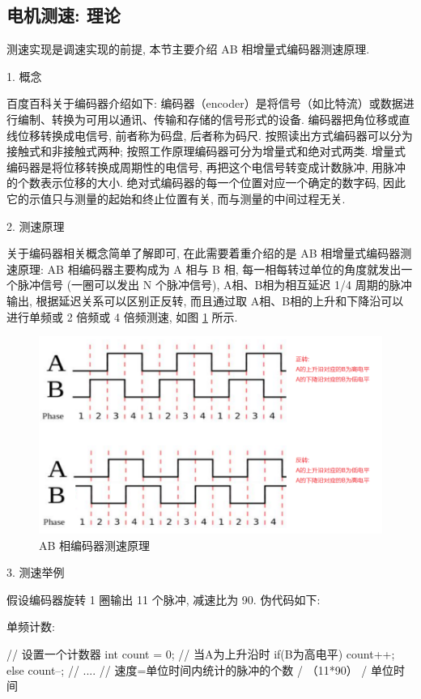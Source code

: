 \documentclass[openany, fontset=windowsold]{ctexbook}
\theoremstyle{kaiti}
\theoremstyle{normal}
\begin{document}
\subsection{电机测速: 理论}

测速实现是调速实现的前提, 本节主要介绍 AB 相增量式编码器测速原理.

1. 概念

百度百科关于编码器介绍如下: 编码器（encoder）是将信号（如比特流）或数据进行编制、转换为可用以通讯、传输和存储的信号形式的设备. 编码器把角位移或直线位移转换成电信号, 前者称为码盘, 后者称为码尺. 按照读出方式编码器可以分为接触式和非接触式两种; 按照工作原理编码器可分为增量式和绝对式两类. 增量式编码器是将位移转换成周期性的电信号, 再把这个电信号转变成计数脉冲, 用脉冲的个数表示位移的大小. 绝对式编码器的每一个位置对应一个确定的数字码, 因此它的示值只与测量的起始和终止位置有关, 而与测量的中间过程无关.

2. 测速原理

关于编码器相关概念简单了解即可, 在此需要着重介绍的是 AB 相增量式编码器测速原理: AB 相编码器主要构成为 A 相与 B 相, 每一相每转过单位的角度就发出一个脉冲信号 (一圈可以发出 N 个脉冲信号), A相、B相为相互延迟 1/4 周期的脉冲输出, 根据延迟关系可以区别正反转, 而且通过取 A相、B相的上升和下降沿可以进行单频或 2 倍频或 4 倍频测速, 如图 \ref{fig:speed_measure_AB_phase} 所示.

\begin{figure}[!ht]
  \centering
  \includegraphics[width=.9\textwidth]{speed_measure_AB_phase.png}
  \caption{AB 相编码器测速原理}
  \label{fig:speed_measure_AB_phase}
\end{figure}

3. 测速举例

假设编码器旋转 1 圈输出 11 个脉冲, 减速比为 90. 伪代码如下:

单频计数:

\begin{cpp}
  // 设置一个计数器
  int count = 0;
  // 当A为上升沿时
  if(B为高电平){
      count++;
  }else {
      count--;
  }
  // ....
  // 速度=单位时间内统计的脉冲的个数 / （11*90） / 单位时间
\end{cpp}
\end{document}
